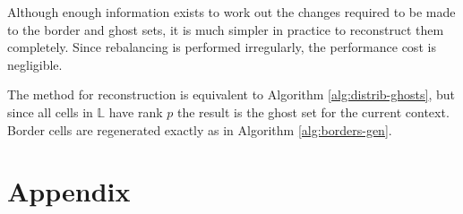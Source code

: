 \documentclass{IIBproject}
\numberwithin{figure}{section}
\begin{document}
Although enough information exists to work out the changes required to be made to the border and ghost sets, it is much simpler in practice to reconstruct them completely. Since rebalancing is performed irregularly, the performance cost is negligible.

The method for reconstruction is equivalent to Algorithm \ref{alg:distrib-ghosts}, but since all cells in $\mathbb{L}$ have rank $p$ the result is the ghost set for the current context. Border cells are regenerated exactly as in Algorithm \ref{alg:borders-gen}.












\clearpage
\appendix
\section{Appendix}
\end{document}
